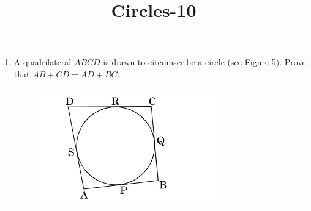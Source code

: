 \documentclass{article}
\begin{document}
\title{Circles-10}
\begin{enumerate}
	\item A quadrilateral $ABCD$ is drawn to circumscribe a circle (see Figure 5). Prove that $AB + CD = AD + BC$.
		\begin{figure}[!htb]
		\centering
			\includegraphics[width=\columnwidth]{fig.png}
		

\end{figure}
\end{enumerate}
\end{document}
